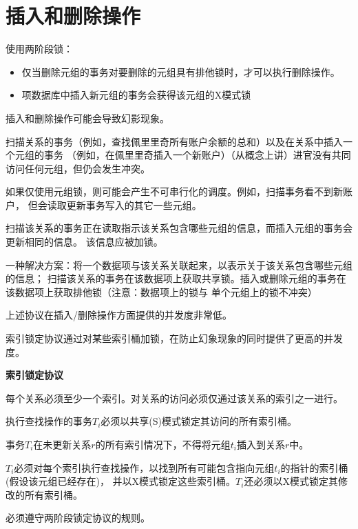 \section{插入和删除操作}

使用两阶段锁：
\begin{itemize}
    \item 仅当删除元组的事务对要删除的元组具有排他锁时，才可以执行删除操作。
    \item 项数据库中插入新元组的事务会获得该元组的X模式锁
\end{itemize}

插入和删除操作可能会导致幻影现象。

\noindent 扫描关系的事务（例如，查找佩里里奇所有账户余额的总和）以及在关系中插入一个元组的事务
（例如，在佩里里奇插入一个新账户）（从概念上讲）进官没有共同访问任何元组，但仍会发生冲突。

如果仅使用元组锁，则可能会产生不可串行化的调度。例如，扫描事务看不到新账户，
但会读取更新事务写入的其它一些元组。

扫描该关系的事务正在读取指示该关系包含哪些元组的信息，而插入元组的事务会更新相同的信息。
该信息应被加锁。

一种解决方案：将一个数据项与该关系关联起来，以表示关于该关系包含哪些元组的信息；
扫描该关系的事务在该数据项上获取共享锁。插入或删除元组的事务在该数据项上获取排他锁（注意：数据项上的锁与
单个元组上的锁不冲突）

上述协议在插入/删除操作方面提供的并发度非常低。

索引锁定协议通过对某些索引桶加锁，在防止幻象现象的同时提供了更高的并发度。

\noindent\textbf{索引锁定协议}

每个关系必须至少一个索引。对关系的访问必须仅通过该关系的索引之一进行。

执行查找操作的事务$T_i$必须以共享(S)模式锁定其访问的所有索引桶。

事务$T_i$在未更新关系$r$的所有索引情况下，不得将元组$t_i$插入到关系$r$中。

$T_i$必须对每个索引执行查找操作，以找到所有可能包含指向元组$t_i$的指针的索引桶(假设该元组已经存在)，
并以X模式锁定这些索引桶。$T_i$还必须以X模式锁定其修改的所有索引桶。

必须遵守两阶段锁定协议的规则。

